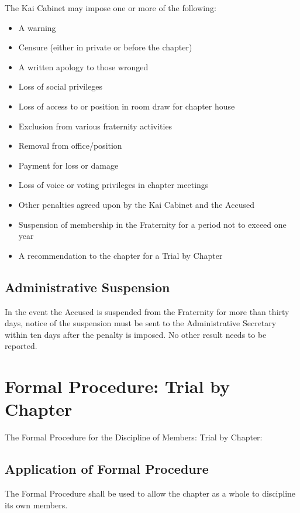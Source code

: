 The Kai Cabinet may impose one or more of the following:
\begin{itemize}
    \item A warning
    \item Censure (either in private or before the chapter)
    \item A written apology to those wronged
    \item Loss of social privileges
    \item Loss of access to or position in room draw for chapter house
    \item Exclusion from various fraternity activities
    \item Removal from office/position
    \item Payment for loss or damage
    \item Loss of voice or voting privileges in chapter meetings
    \item Other penalties agreed upon by the Kai Cabinet and the Accused
    \item Suspension of membership in the Fraternity for a period not to exceed
        one year
    \item A recommendation to the chapter for a Trial by Chapter
\end{itemize}

\subsection{Administrative Suspension}

In the event the Accused is suspended from the Fraternity for more than thirty
days, notice of the suspension must be sent to the Administrative Secretary
within ten days after the penalty is imposed.
No other result needs to be reported.

\section{Formal Procedure: Trial by Chapter}
\label{sec:trial-by-chapter}

The Formal Procedure for the Discipline of Members: Trial by Chapter:

\subsection{Application of Formal Procedure}

The Formal Procedure shall be used to allow the chapter as a whole to
discipline its own members.

